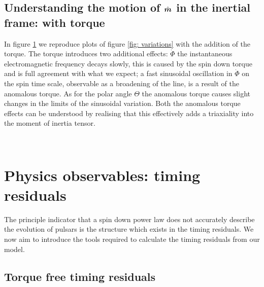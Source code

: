 \documentclass[../full_thesis/full_thesis.tex]{subfiles}
\begin{document}
\subsection{Understanding the motion of $\hat{\boldsymbol{m}}$ in the inertial frame: with torque}
In figure \ref{fig: variations with torque} we reproduce plots of figure
\ref{fig: variations} with the addition of the torque. The torque introduces
two additional effects: $\dot{\Phi}$ the instantaneous electromagnetic
frequency decays slowly, this is caused by the spin down torque and is full
agreement with what we expect; a fast sinusoidal oscillation in $\dot{\Phi}$ on
the spin time scale, observable as a broadening of the line, is a result of the
anomalous torque. As for the polar angle $\Theta$ the anomalous torque causes
slight changes in the limits of the sinusoidal variation. Both the anomalous
torque effects can be understood by realising that this effectively adds a
triaxiality into the moment of inertia tensor. %

\begin{figure}[ht]
\centering
	 \\
\caption{}
\label{fig: variations with torque}
\end{figure}

\section{Physics observables: timing residuals}

The principle indicator that a spin down power law does not accurately describe
the evolution of pulsars is the structure which exists in the timing
residuals. We now aim to introduce the tools required to calculate the timing
residuals from our model.

\subsection{Torque free timing residuals}
\end{document}
